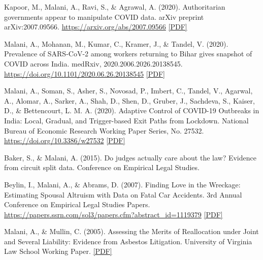 \begin{tablist}
        \item[2020] \tab{}Kapoor, M., Malani, A., Ravi, S., \& Agrawal, A. (2020). Authoritarian governments appear to manipulate COVID data. arXiv preprint arXiv:2007.09566. \href{https://arxiv.org/abs/2007.09566}{https://arxiv.org/abs/2007.09566} \href{https://github.com/anup-malani/website_personal/blob/main/publications/2020_KapoorMalani_Arxiv_AuthoritarianGovtCOVIDReporting.pdf}{[PDF]}

        \item[2020] \tab{}Malani, A., Mohanan, M., Kumar, C., Kramer, J., \& Tandel, V. (2020). Prevalence of SARS-CoV-2 among workers returning to Bihar gives snapshot of COVID across India. medRxiv, 2020.2006.2026.20138545. \href{https://doi.org/10.1101/2020.06.26.20138545}{https://doi.org/10.1101/2020.06.26.20138545} \href{https://github.com/anup-malani/website_personal/blob/main/publications/2020_Malani_Medrxiv_BiharCOVIDPrevalence.pdf}{[PDF]}

        \item[2020] \tab{}Malani, A., Soman, S., Asher, S., Novosad, P., Imbert, C., Tandel, V., Agarwal, A., Alomar, A., Sarker, A., Shah, D., Shen, D., Gruber, J., Sachdeva, S., Kaiser, D., \& Bettencourt, L. M. A. (2020). Adaptive Control of COVID-19 Outbreaks in India: Local, Gradual, and Trigger-based Exit Paths from Lockdown. National Bureau of Economic Research Working Paper Series, No. 27532. \href{https://doi.org/10.3386/w27532}{https://doi.org/10.3386/w27532} \href{https://github.com/anup-malani/website_personal/blob/main/publications/2020_Malani_NBERw27532_AdaptiveControlCOVID.pdf}{[PDF]}
        
        \item[2015] \tab{}Baker, S., \& Malani, A. (2015). Do judges actually care about the law? Evidence from circuit split data. Conference on Empirical Legal Studies.  

        \item[2007] \tab{}Beylin, I., Malani, A., \& Abrams, D. (2007). Finding Love in the Wreckage: Estimating Spousal Altruism with Data on Fatal Car Accidents. 3rd Annual Conference on Empirical Legal Studies Papers.  \href{https://papers.ssrn.com/sol3/papers.cfm?abstract_id=1119379}{https://papers.ssrn.com/sol3/papers.cfm?abstract\_id=1119379} \href{https://github.com/anup-malani/website_personal/blob/main/publications/2007_BeylinMalani_LovWreckage.pdf}{[PDF]} 

        \item[2005] \tab{}Malani, A., \& Mullin, C. (2005). Assessing the Merits of Reallocation under Joint and Several Liability: Evidence from Asbestos Litigation. University of Virginia Law School Working Paper. \href{https://github.com/anup-malani/website_personal/blob/main/publications/2005_MalaniMullin_WP_ReallocationJointSeveral.pdf}{[PDF]} 


\end{tablist}

